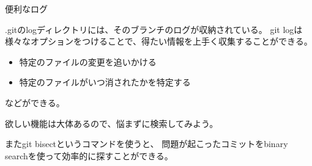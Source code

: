 \documentclass[12pt, unicode]{beamer}
\begin{document}
\begin{frame}{便利なログ}

.gitのlogディレクトリには、そのブランチのログが収納されている。
git logは様々なオプションをつけることで、得たい情報を上手く収集することができる。

\begin{itemize}
\item 特定のファイルの変更を追いかける
\item 特定のファイルがいつ消されたかを特定する
\end{itemize}

などができる。

欲しい機能は大体あるので、悩まずに検索してみよう。

またgit bisectというコマンドを使うと、
問題が起こったコミットをbinary searchを使って効率的に探すことができる。

\end{frame}
\end{document}
